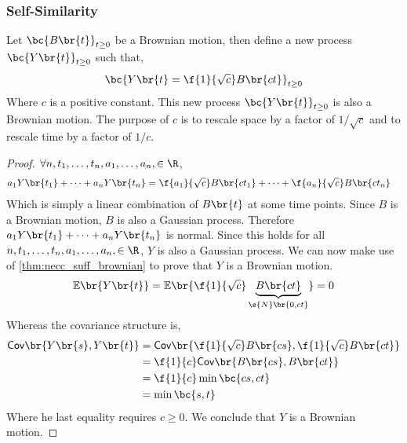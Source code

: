 \documentclass{article}
\newcommand{\Cov}{\textsf{Cov}}
\newcommand{\Exp}{\mathbb{E}}
\begin{document}
    \subsubsection{Self-Similarity}
    Let $\bc{B\br{t}}_{t \geq 0}$ be a Brownian motion, then define a new process $\bc{Y\br{t}}_{t \geq 0}$ such that,
    \[ \bc{Y\br{t} = \f{1}{\sqrt{c}} B\br{c t}}_{t \geq 0} \]
    Where $c$ is a positive constant. This new process $\bc{Y\br{t}}_{t \geq 0}$ is also a Brownian motion. The purpose of $c$ is to rescale space by a factor of $1/\sqrt{c}$ and to rescale time by a factor of $1/c$.
    \begin{proof}
        $\forall n, t_1, \ldots, t_n, a_1, \ldots, a_n, \in \R$,
        \begin{align*}
        a_1 Y\br{t_1} + \cdots + a_n Y\br{t_n}
        &= \f{a_1}{\sqrt{c}} B\br{c t_1} + \cdots + \f{a_n}{\sqrt{c}} B\br{c t_n}
        \end{align*}
        Which is simply a linear combination of $B\br{t}$ at some time points. Since $B$ is a Brownian motion, $B$ is also a Gaussian process. Therefore $a_1 Y\br{t_1} + \cdots + a_n Y\br{t_n}$ is normal. Since this holds for all $n, t_1, \ldots, t_n, a_1, \ldots, a_n, \in \R$, $Y$ is also a Gaussian process. We can now make use of \cref{thm:necc_suff_brownian} to prove that $Y$ is a Brownian motion.
        \[ \Exp\br{Y\br{t}} = \Exp\br{\f{1}{\sqrt{c}}\underbrace{B\br{ct}}_{\s{N}\br{0, ct}}} = 0 \]
        Whereas the covariance structure is,
        \begin{align*}
        \Cov\br{Y\br{s}, Y\br{t}}
        &= \Cov\br{\f{1}{\sqrt{c}}B\br{cs}, \f{1}{\sqrt{c}}B\br{ct}} \\
        &= \f{1}{c}\Cov\br{B\br{cs}, B\br{ct}} \\
        &= \f{1}{c}\min\bc{cs, ct} \\
        &= \min\bc{s, t}
        \end{align*}
        Where he last equality requires $c \geq 0$. We conclude that $Y$ is a Brownian motion.
    \end{proof}
\end{document}
